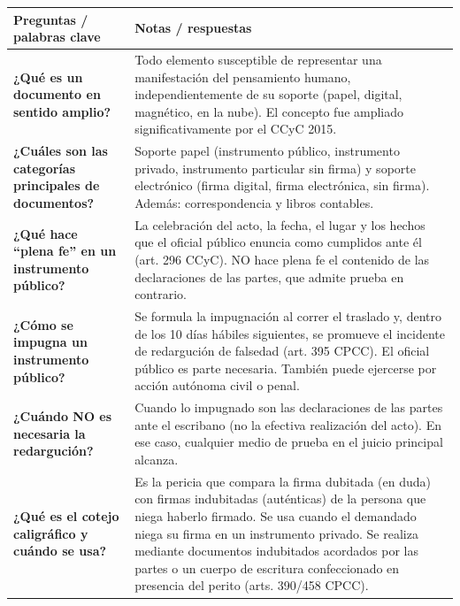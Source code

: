 \documentclass[12pt,oneside]{book}
\begin{document}
\begin{longtable}{
    >{\raggedright\arraybackslash}p{}
    >{\raggedright\arraybackslash}p{}
}
\toprule
\textbf{Preguntas / palabras clave} & \textbf{Notas / respuestas} \\
\midrule
\endhead

\textbf{¿Qué es un documento en sentido amplio?} &
Todo elemento susceptible de representar una manifestación del pensamiento humano, independientemente de su soporte (papel, digital, magnético, en la nube). El concepto fue ampliado significativamente por el CCyC 2015. \\

\textbf{¿Cuáles son las categorías principales de documentos?} &
Soporte papel (instrumento público, instrumento privado, instrumento particular sin firma) y soporte electrónico (firma digital, firma electrónica, sin firma). Además: correspondencia y libros contables. \\

\textbf{¿Qué hace ``plena fe'' en un instrumento público?} &
La celebración del acto, la fecha, el lugar y los hechos que el oficial público enuncia como cumplidos ante él (art. 296 CCyC). NO hace plena fe el contenido de las declaraciones de las partes, que admite prueba en contrario. \\

\textbf{¿Cómo se impugna un instrumento público?} &
Se formula la impugnación al correr el traslado y, dentro de los 10 días hábiles siguientes, se promueve el incidente de redargución de falsedad (art. 395 CPCC). El oficial público es parte necesaria. También puede ejercerse por acción autónoma civil o penal. \\

\textbf{¿Cuándo NO es necesaria la redargución?} &
Cuando lo impugnado son las declaraciones de las partes ante el escribano (no la efectiva realización del acto). En ese caso, cualquier medio de prueba en el juicio principal alcanza. \\

\textbf{¿Qué es el cotejo caligráfico y cuándo se usa?} &
Es la pericia que compara la firma dubitada (en duda) con firmas indubitadas (auténticas) de la persona que niega haberlo firmado. Se usa cuando el demandado niega su firma en un instrumento privado. Se realiza mediante documentos indubitados acordados por las partes o un cuerpo de escritura confeccionado en presencia del perito (arts. 390/458 CPCC). \\


\end{longtable}
\end{document}
